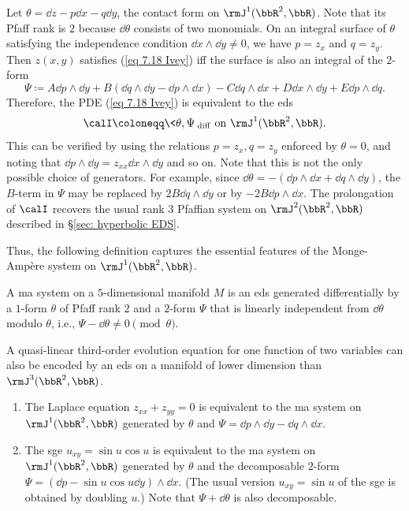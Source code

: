 Let $\theta=\dd z-p\dd x-q\dd y$, the contact form on $\rmJ^1(\bbR^2,\bbR)$. Note that its Pfaff rank is $2$ because $\dd\theta$ consists of two monomials. On an integral surface of $\theta$ satisfying the independence condition $\dd x\wedge\dd y\neq 0$, we have $p=z_x$ and $q=z_y$. Then $z(x,y)$ satisfies (\ref{eq 7.18 Ivey}) iff the surface is also an integral of the $2$-form 
\[
    \Psi\coloneqq A\dd p\wedge \dd y+B(\dd q\wedge \dd y-\dd p\wedge \dd x)-C\dd q\wedge \dd x+D\dd x\wedge\dd y+E\dd p\wedge \dd q.\label{eq 7.19 Ivey}
\]
Therefore, the PDE (\ref{eq 7.18 Ivey}) is equivalent to the \gls{eds} 
\[\calI\coloneqq \<\theta,\Psi\>_{\mathrm{diff}} \text{ on }\rmJ^1(\bbR^2,\bbR).\]
This can be verified by using the relations $p=z_x,q=z_y$ enforced by $\theta=0$, and noting that $\dd p\wedge\dd y=z_{xx}\dd x\wedge \dd y$ and so on. Note that this is not the only possible choice of generators. For example, since $\dd\theta=-(\dd p\wedge\dd x+\dd q\wedge \dd y)$, the $B$-term in $\Psi$ may be replaced by $2B\dd q\wedge \dd y$ or by $-2B\dd p\wedge \dd x$. The prolongation of $\calI$ recovers the usual rank $3$ Pfaffian system on $\rmJ^2(\bbR^2,\bbR)$ described in \S\ref{sec: hyperbolic EDS}.

Thus, the following definition captures the essential features of the Monge-Amp\`ere system on $\rmJ^1(\bbR^2,\bbR)$.

\begin{defn}
    A \gls{ma} system on a $5$-dimensional manifold $M$ is an \gls{eds} generated differentially by a $1$-form $\theta$ of Pfaff rank $2$ and a $2$-form $\Psi$ that is linearly independent from $\dd\theta$ modulo $\theta$, i.e., $\Psi-\dd\theta\neq 0\pmod{\theta}$.
\end{defn}

\begin{rem}
    A quasi-linear third-order evolution equation for one function of two variables can also be encoded by an \gls{eds} on a manifold of lower dimension than $\rmJ^3(\bbR^2,\bbR)$.
\end{rem}

\begin{example}\label{ex 7.4.6 Ivey}
    \begin{enumerate}
        \item The Laplace equation $z_{xx}+z_{yy}=0$ is equivalent to the \gls{ma} system on $\rmJ^1(\bbR^2,\bbR)$ generated by $\theta$ and $\Psi=\dd p\wedge\dd y-\dd q\wedge \dd x$.
        \item The \gls{sge} $u_{xy}=\sin u\cos u$ is equivalent to the \gls{ma} system on $\rmJ^1(\bbR^2,\bbR)$ generated by $\theta$ and the decomposable $2$-form $\Psi=(\dd p-\sin u \cos u\dd y)\wedge\dd x$. (The usual version $u_{xy}=\sin u$ of the \gls{sge} is obtained by doubling $u$.) Note that $\Psi+\dd\theta$ is also decomposable.
    \end{enumerate}
\end{example}


